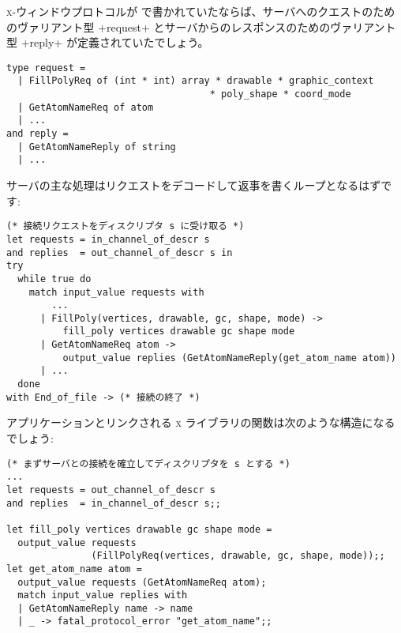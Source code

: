 \begin{example}
\textsc{x}-ウィンドウプロトコルが \ocaml で書かれていたならば、サーバへのクエストのためのヴァリアント型 \ml+request+ とサーバからのレスポンスのためのヴァリアント型 \ml+reply+ が定義されていたでしょう。
%
\begin{lstlisting}
type request =
  | FillPolyReq of (int * int) array * drawable * graphic_context
                                    * poly_shape * coord_mode
  | GetAtomNameReq of atom
  | ...
and reply =
  | GetAtomNameReply of string
  | ...
\end{lstlisting}
%
サーバの主な処理はリクエストをデコードして返事を書くループとなるはずです:
%
\begin{lstlisting}
(* 接続リクエストをディスクリプタ s に受け取る *)
let requests = in_channel_of_descr s
and replies  = out_channel_of_descr s in
try
  while true do
    match input_value requests with
        ...
      | FillPoly(vertices, drawable, gc, shape, mode) ->
          fill_poly vertices drawable gc shape mode
      | GetAtomNameReq atom ->
          output_value replies (GetAtomNameReply(get_atom_name atom))
      | ...
  done
with End_of_file -> (* 接続の終了 *)
\end{lstlisting}
%
アプリケーションとリンクされる \textsc{x} ライブラリの関数は次のような構造になるでしょう:
%
\begin{lstlisting}
(* まずサーバとの接続を確立してディスクリプタを s とする *)
...
let requests = out_channel_of_descr s
and replies  = in_channel_of_descr s;;

let fill_poly vertices drawable gc shape mode =
  output_value requests
               (FillPolyReq(vertices, drawable, gc, shape, mode));;
let get_atom_name atom =
  output_value requests (GetAtomNameReq atom);
  match input_value replies with
  | GetAtomNameReply name -> name
  | _ -> fatal_protocol_error "get_atom_name";;
\end{lstlisting}
\end{example}


